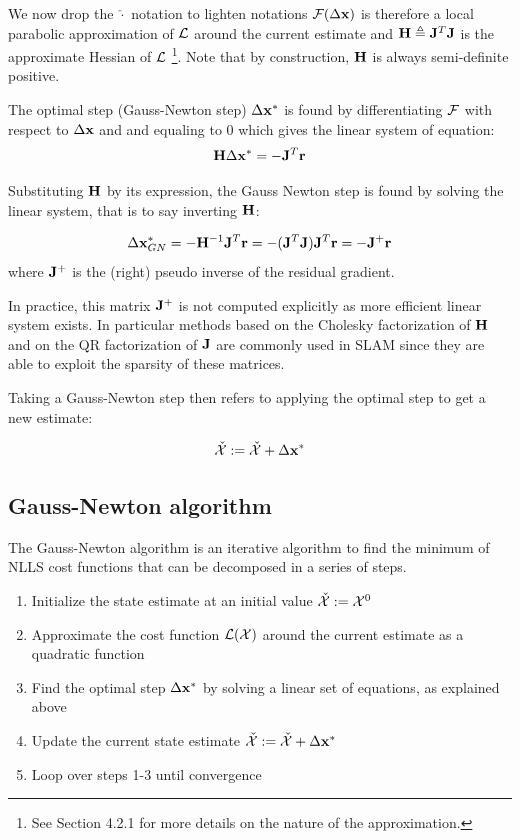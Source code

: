 We now drop the $\check{\cdot}$ notation to lighten notations $\mathcal{F}(\Delta {\bf x})$ is therefore a local parabolic approximation of 
$\mathcal{L}$ around the current estimate and ${\bf H} \triangleq {\bf J}^T {\bf J}$ is the approximate Hessian of $\mathcal{L}$ 
\footnote{See \cite{sola2017course} Section 4.2.1 for more details on the nature of the approximation.}. Note that by construction, ${\bf H}$ is always 
semi-definite positive.

The optimal step (Gauss-Newton step) $\Delta {\bf x}^*$ is found by differentiating $\mathcal{F}$ with respect to $\Delta {\bf x}$ and and equaling to 0 
which gives the linear system of equation:
\begin{equation}
    \bfH \Delta \bfx^* = - \bfJ^T \bfr%
\end{equation}

Substituting ${\bf H}$ by its expression, the Gauss Newton step is found by solving the linear system, that is to say inverting ${\bf H}$:

\begin{equation*}
    \Delta {\bf x}_{GN}^* = - {\bf H}^{-1} {\bf J}^T {\bf r} = - ({\bf J}^T {\bf J}) {\bf J}^T {\bf r} = -  {\bf J}^{+} {\bf r}
\end{equation*}
where ${\bf J}^{+}$ is the (right) pseudo inverse of the residual gradient. 

In practice, this matrix ${\bf J}^{+}$ is not computed explicitly as more efficient linear system exists. In particular methods based on the Cholesky
factorization of ${\bf H}$ and on the QR factorization of ${\bf J}$ are commonly used in SLAM since they are able to exploit the sparsity of these
matrices.

Taking a Gauss-Newton step then refers to applying the optimal step to get a new estimate:

\begin{equation}
    \check{\mathcal{X}} := \check{\mathcal{X}} + \Delta {\bf x}^*
    \label{eq:gaussian_step}
\end{equation}


\subsection{Gauss-Newton algorithm}
The Gauss-Newton algorithm is an iterative algorithm to find the minimum of NLLS cost functions that can be decomposed in a series of steps.
\begin{enumerate}
    \item Initialize the state estimate at an initial value $\check{\mathcal{X}} := \mathcal{X}^0$
    \item Approximate the cost function $\mathcal{L}(\mathcal{X})$ around the current estimate as a quadratic function
    \item Find the optimal step $\Delta {\bf x}^*$ by solving a linear set of equations, as explained above
    \item Update the current state estimate $\check{\mathcal{X}} := \check{\mathcal{X}} + \Delta {\bf x}^*$
    \item Loop over steps 1-3 until convergence
\end{enumerate}




